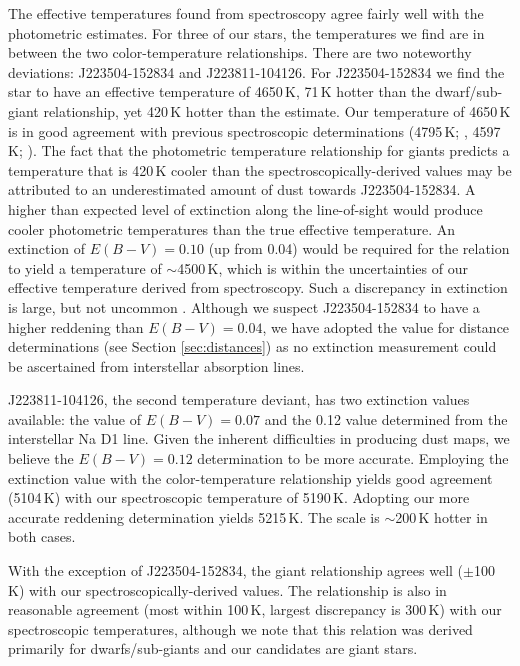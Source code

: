 \documentclass{emulateapj}
\begin{document}
The effective temperatures found from spectroscopy agree fairly well with the photometric estimates. For three of our stars, the temperatures we find are in between the two color-temperature relationships. There are two noteworthy deviations: J223504-152834 and J223811-104126. For J223504-152834 we find the star to have an effective temperature of 4650\,K, 71\,K hotter than the \citet{casagrande;et-al_2010} dwarf/sub-giant relationship, yet 420\,K hotter than the \citet{alonso;et-al_1999} estimate. Our temperature of 4650\,K is in good agreement with previous spectroscopic determinations (4795\,K; \citet{williams;et-al_2011}, 4597\,K; \citet{wylie-de-boer;et-al_2012}). The fact that the \citet{alonso;et-al_1999} photometric temperature relationship for giants predicts a temperature that is 420\,K cooler than the spectroscopically-derived values may be attributed to an underestimated amount of dust towards J223504-152834. A higher than expected level of extinction along the line-of-sight would produce cooler photometric temperatures than the true effective temperature.  An extinction of $E(B-V) = 0.10$ (up from 0.04) would be required for the \citet{alonso;et-al_1999} relation to yield a temperature of ${\sim}$4500\,K, which is within the uncertainties of our effective temperature derived from spectroscopy. Such a discrepancy in extinction is large, but not uncommon \citep[e.g. see][and the case of J223811-104126]{peek;graves_2010,nataf;et-al_2012}. Although we suspect J223504-152834 to have a higher reddening than $E(B-V) = 0.04$, we have adopted the \citet{schlegel;et-al_1998} value for distance determinations (see Section \ref{sec:distances}) as no extinction measurement could be ascertained from interstellar absorption lines. 

J223811-104126, the second temperature deviant, has two extinction values available: the \citet{schlegel;et-al_1998} value of $E(B-V) = 0.07$ and the 0.12 value determined from the interstellar Na D1 line. Given the inherent difficulties in producing dust maps, we believe the $E(B-V) = 0.12$ determination to be more accurate. Employing the \citet{schlegel;et-al_1998} extinction value with the \citet{alonso;et-al_1999} color-temperature relationship yields good agreement (5104\,K) with our spectroscopic temperature of 5190\,K. Adopting our more accurate reddening determination yields 5215\,K. The \citet{casagrande;et-al_2010} scale is ${\sim}$200\,K hotter in both cases.

With the exception of J223504-152834, the \citet{alonso;et-al_1999} giant relationship agrees well ($\pm$100\,K) with our spectroscopically-derived values. The \citet{casagrande;et-al_2010} relationship is also in reasonable agreement (most within 100\,K, largest discrepancy is 300\,K) with our spectroscopic temperatures, although we note that this relation was derived primarily for dwarfs/sub-giants and our candidates are giant stars.
\end{document}
